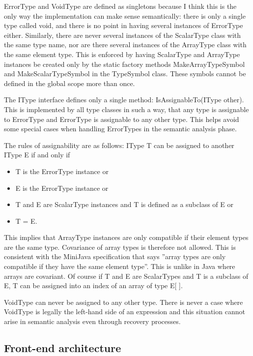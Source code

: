 \documentclass[a4paper,11pt]{article}
\begin{document}
ErrorType and VoidType are defined as singletons because I think this is the only way the implementation can make sense semantically: there is only a single type called void, and there is no point in having several instances of ErrorType either. Similarly, there are never several instances of the ScalarType class with the same type name, nor are there several instances of the ArrayType class with the same element type. This is enforced by having ScalarType and ArrayType instances be created only by the static factory methods MakeArrayTypeSymbol and MakeScalarTypeSymbol in the TypeSymbol class. These symbols cannot be defined in the global scope more than once.

The IType interface defines only a single method: IsAssignableTo(IType other). This is implemented by all type classes in such a way, that any type is assignable to ErrorType and ErrorType is assignable to any other type. This helps avoid some special cases when handling ErrorTypes in the semantic analysis phase.

The rules of assignability are as follows: IType T can be assigned to another IType E if and only if
\begin{itemize}
    \item T is the ErrorType instance or
    \item E is the ErrorType instance or
    \item T and E are ScalarType instances and T is defined as a subclass of E or
    \item T = E.
\end{itemize}

This implies that ArrayType instances are only compatible if their element types are the same type. Covariance of array types is therefore not allowed. This is consistent with the MiniJava specification that says ''array types are only compatible if they have the same element type''. This is unlike in Java where arrays are covariant. Of course if T and E are ScalarTypes and T is a subclass of E, T can be assigned into an index of an array of type E[ ].

VoidType can never be assigned to any other type. There is never a case where VoidType is legally the left-hand side of an expression and this situation cannot arise in semantic analysis even through recovery processes.

\subsection{Front-end architecture}
\end{document}

